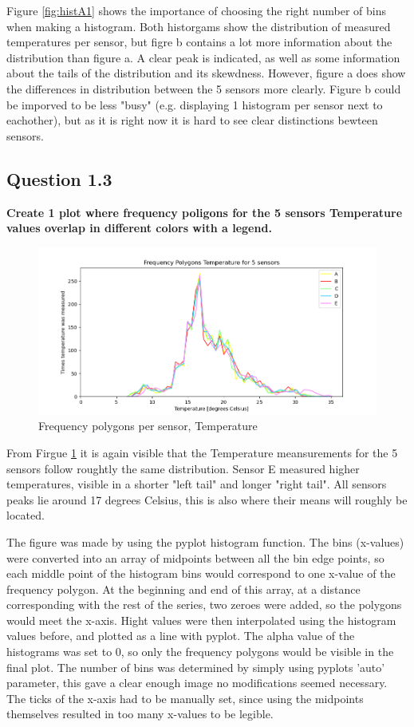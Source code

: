 \documentclass{report}
\begin{document}
	Figure \ref{fig:histA1} shows the importance of choosing the right number of bins when making a histogram. Both historgams show the distribution of measured temperatures per sensor, but figre b contains a lot more information about the distribution than figure a. A clear peak is indicated, as well as some information about the tails of the distribution and its skewdness. However, figure a does show the differences in distribution between the 5 sensors more clearly. Figure b could be imporved to be less "busy" (e.g. displaying 1 histogram per sensor next to eachother), but as it is right now it is hard to see clear distinctions bewteen sensors.
	
	\subsection{Question 1.3}
	\textbf{Create 1 plot where frequency poligons for the 5 sensors Temperature values overlap in different colors with a legend.}
	
	\begin{figure}[h!]
		\includegraphics[width=\linewidth]{GEO1001_hw01_images/GEO1001_hw01_A1_polygons.png}
		\caption{Frequency polygons per sensor, Temperature}
		\label{fig:freqpols}
	\end{figure}

	From Firgue \ref{fig:freqpols} it is again visible that the Temperature meansurements for the 5 sensors follow roughtly the same distribution. Sensor E measured higher temperatures, visible in a shorter "left tail" and longer "right tail". All sensors peaks lie around 17 degrees Celsius, this is also where their means will roughly be located.
	
	The figure was made by using the pyplot histogram function. The bins (x-values) were converted into an array of midpoints between all the bin edge points, so each middle point of the histogram bins would correspond to one x-value of the frequency polygon. At the beginning and end of this array, at a distance corresponding with the rest of the series, two zeroes were added, so the polygons would meet the x-axis. Hight values were then interpolated using the histogram values before, and plotted as a line with pyplot. The alpha value of the histograms was set to 0, so only the frequency polygons would be visible in the final plot. The number of bins was determined by simply using pyplots 'auto' parameter, this gave a clear enough image no modifications seemed necessary. The ticks of the x-axis had to be manually set, since using the midpoints themselves resulted in too many x-values to be legible.
	
\end{document}
